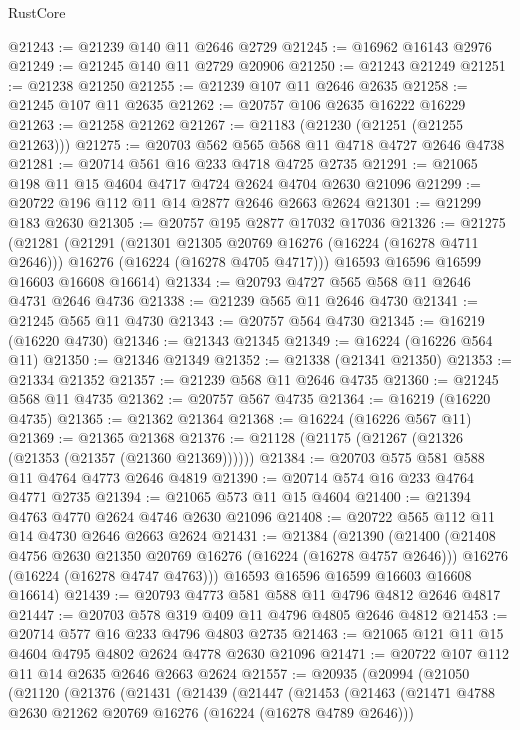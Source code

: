 \begin{lexlean}{RustCore}
\begin{coremodule}
@21243 := @21239 @140 @11 @2646 @2729
@21245 := @16962 @16143 @2976
@21249 := @21245 @140 @11 @2729 @20906
@21250 := @21243 @21249
@21251 := @21238 @21250
@21255 := @21239 @107 @11 @2646 @2635
@21258 := @21245 @107 @11 @2635
@21262 := @20757 @106 @2635 @16222 @16229
@21263 := @21258 @21262
@21267 := @21183 (@21230 (@21251 (@21255 @21263)))
@21275 := @20703 @562 @565 @568 @11 @4718 @4727 @2646 @4738
@21281 := @20714 @561 @16 @233 @4718 @4725 @2735
@21291 := @21065 @198 @11 @15 @4604 @4717 @4724 @2624 @4704 @2630 @21096
@21299 := @20722 @196 @112 @11 @14 @2877 @2646 @2663 @2624
@21301 := @21299 @183 @2630
@21305 := @20757 @195 @2877 @17032 @17036
@21326 := @21275
    (@21281
      (@21291
        (@21301 @21305 @20769 @16276 (@16224 (@16278 @4711 @2646)))
        @16276
        (@16224 (@16278 @4705 @4717)))
      @16593
      @16596
      @16599
      @16603
      @16608
      @16614)
@21334 := @20793 @4727 @565 @568 @11 @2646 @4731 @2646 @4736
@21338 := @21239 @565 @11 @2646 @4730
@21341 := @21245 @565 @11 @4730
@21343 := @20757 @564 @4730
@21345 := @16219 (@16220 @4730)
@21346 := @21343 @21345
@21349 := @16224 (@16226 @564 @11)
@21350 := @21346 @21349
@21352 := @21338 (@21341 @21350)
@21353 := @21334 @21352
@21357 := @21239 @568 @11 @2646 @4735
@21360 := @21245 @568 @11 @4735
@21362 := @20757 @567 @4735
@21364 := @16219 (@16220 @4735)
@21365 := @21362 @21364
@21368 := @16224 (@16226 @567 @11)
@21369 := @21365 @21368
@21376 := @21128 (@21175 (@21267 (@21326 (@21353 (@21357 (@21360 @21369))))))
@21384 := @20703 @575 @581 @588 @11 @4764 @4773 @2646 @4819
@21390 := @20714 @574 @16 @233 @4764 @4771 @2735
@21394 := @21065 @573 @11 @15 @4604
@21400 := @21394 @4763 @4770 @2624 @4746 @2630 @21096
@21408 := @20722 @565 @112 @11 @14 @4730 @2646 @2663 @2624
@21431 := @21384
    (@21390
      (@21400
        (@21408 @4756 @2630 @21350 @20769 @16276 (@16224 (@16278 @4757 @2646)))
        @16276
        (@16224 (@16278 @4747 @4763)))
      @16593
      @16596
      @16599
      @16603
      @16608
      @16614)
@21439 := @20793 @4773 @581 @588 @11 @4796 @4812 @2646 @4817
@21447 := @20703 @578 @319 @409 @11 @4796 @4805 @2646 @4812
@21453 := @20714 @577 @16 @233 @4796 @4803 @2735
@21463 := @21065 @121 @11 @15 @4604 @4795 @4802 @2624 @4778 @2630 @21096
@21471 := @20722 @107 @112 @11 @14 @2635 @2646 @2663 @2624
@21557 := @20935
    (@20994
      (@21050
        (@21120
          (@21376
            (@21431
              (@21439
                (@21447
                  (@21453
                    (@21463
                      (@21471 @4788 @2630 @21262 @20769 @16276 (@16224 (@16278 @4789 @2646)))

\end{coremodule}
\end{lexlean}
